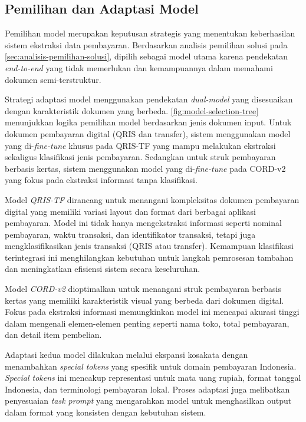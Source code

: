 \subsection{Pemilihan dan Adaptasi Model}
\label{subsec:pemilihan-adaptasi-model}

Pemilihan model merupakan keputusan strategis yang menentukan keberhasilan sistem ekstraksi data pembayaran. Berdasarkan analisis pemilihan solusi pada \autoref{sec:analisis-pemilihan-solusi}, \donut{} dipilih sebagai model utama karena pendekatan \emph{end-to-end} yang tidak memerlukan \ocr{} dan kemampuannya dalam memahami dokumen semi-terstruktur.


Strategi adaptasi model menggunakan pendekatan \emph{dual-model} yang disesuaikan dengan karakteristik dokumen yang berbeda. \autoref{fig:model-selection-tree} menunjukkan logika pemilihan model berdasarkan jenis dokumen input. Untuk dokumen pembayaran digital (QRIS dan transfer), sistem menggunakan model yang di-\emph{fine-tune} khusus pada \dataset{} QRIS-TF yang mampu melakukan ekstraksi sekaligus klasifikasi jenis pembayaran. Sedangkan untuk struk pembayaran berbasis kertas, sistem menggunakan model yang di-\emph{fine-tune} pada \dataset{} CORD-v2 yang fokus pada ekstraksi informasi tanpa klasifikasi.

Model \textit{QRIS-TF} dirancang untuk menangani kompleksitas dokumen pembayaran digital yang memiliki variasi layout dan format dari berbagai aplikasi pembayaran. Model ini tidak hanya mengekstraksi informasi seperti nominal pembayaran, waktu transaksi, dan identifikator transaksi, tetapi juga mengklasifikasikan jenis transaksi (QRIS atau transfer). Kemampuan klasifikasi terintegrasi ini menghilangkan kebutuhan untuk langkah pemrosesan tambahan dan meningkatkan efisiensi sistem secara keseluruhan.

Model \textit{CORD-v2} dioptimalkan untuk menangani struk pembayaran berbasis kertas yang memiliki karakteristik visual yang berbeda dari dokumen digital. Fokus pada ekstraksi informasi memungkinkan model ini mencapai akurasi tinggi dalam mengenali elemen-elemen penting seperti nama toko, total pembayaran, dan detail item pembelian.

Adaptasi kedua model dilakukan melalui ekspansi kosakata dengan menambahkan \emph{special tokens} yang spesifik untuk domain pembayaran Indonesia. \emph{Special tokens} ini mencakup representasi untuk mata uang rupiah, format tanggal Indonesia, dan terminologi pembayaran lokal. Proses adaptasi juga melibatkan penyesuaian \emph{task prompt} yang mengarahkan model untuk menghasilkan output dalam format yang konsisten dengan kebutuhan sistem.
